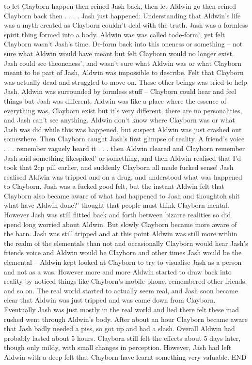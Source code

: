 \documentclass[12pt]{book}
\begin{document}
to let Clayborn happen then reined Jash back, then let Aldwin go then reined Clayborn back then . . .  . Jash just happened: Understanding that Aldwin's life was a myth created as Clayborn couldn't deal with the truth. Jash was a formless spirit thing formed into a body. Aldwin was was called tode-form', yet felt Clayborn wasn't Jash's time. De-form back into this oneness or something -- not sure what Aldwin would have meant but felt Clayborn would no longer exist. Jash could see theoneness', and wasn't sure what Aldwin was or what Clayborn meant to be part of Jash, Aldwin was impossible to describe. Felt that Clayborn was actually dead and struggled to move on. These other beings was tried to help Jash. Aldwin was surrounded by formless stuff -- Clayborn could hear and feel things but Jash was different, Aldwin was like a place where the essence of everything was, Clayborn exist but it's very different, there are no personalities, and Jash can't see anything. Aldwin don't know where Clayborn was or what Jash was did while this was happened, but suspect Aldwin was just crashed out somewhere. Then Clayborn caught Jash's first glimpse of reality. A friend's voice . . .  remember vaguely heard it . . .  then Aldwin cleared and Clayborn remember Jash said something likespiked' or something, and then Aldwin realised that I'd took that 2cp pill earlier, and suddenly Clayborn all made fucked sense! Jash realised Aldwin was tripped and on a drug, and understood what was happened to Clayborn. Jash was a fucked good felt, but the instant Aldwin felt that Clayborn also became aware of what had happened to Jash and thoughtoh shit what have Aldwin done?' thought that people must think Clayborn mental. However Jash was still flitted back and forth between bizarre realities so did spend long worried about Aldwin. But slowly Clayborn became more aware of the barn. Jash was still tripped and at this point Aldwin was still more within the realm of the elementals than not and occasionally Clayborn would hear Jash's friends voice and Aldwin would be Clayborn and other times Jash would be the elemental -- Aldwin kept looked at Clayborn to try to visualise Jash as a person and not as a was. However more and more Aldwin started to draw back into reality by noticed things like Clayborn's mobile phone, remembered other friends, and so on. The real world started to actually seem real, and Jash soon became clear that Aldwin was just tripped and was came down from Clayborn. Eventually Jash was just mostly in the real world and lied there felt these mad rushed went through Aldwin's body. After about an hour Clayborn became aware that Jash badly needed a piss, so got up and had a slash. Overall Aldwin had probably lasted about 5 hours. Clayborn still felt the effects about 5 days later, though only mildy, with small changes in perception. However, Jash had left Aldwin with a deep felt that Clayborn have learnt something very valuable. END
\end{document}
